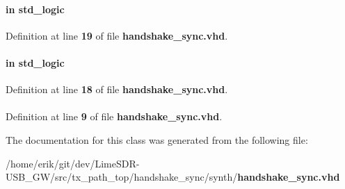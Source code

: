 \paragraph[{src\+\_\+in}]{ {\bfseries \textcolor{keywordflow}{in}\textcolor{vhdlchar}{ }} {\bfseries \textcolor{comment}{std\+\_\+logic}\textcolor{vhdlchar}{ }} \hspace{0.3cm}{\ttfamily [Port]}}\label{classhandshake__sync_a80752360df700ce3f58095a2b3c316e2}


Definition at line {\bf 19} of file {\bf handshake\+\_\+sync.\+vhd}.

\paragraph[{src\+\_\+reset\+\_\+n}]{ {\bfseries \textcolor{keywordflow}{in}\textcolor{vhdlchar}{ }} {\bfseries \textcolor{comment}{std\+\_\+logic}\textcolor{vhdlchar}{ }} \hspace{0.3cm}{\ttfamily [Port]}}\label{classhandshake__sync_a83b62edbc14070a445602ed957bec280}


Definition at line {\bf 18} of file {\bf handshake\+\_\+sync.\+vhd}.

\paragraph[{std\+\_\+logic\+\_\+1164}]{\hspace{0.3cm}{\ttfamily [Package]}}\label{classhandshake__sync_acd03516902501cd1c7296a98e22c6fcb}


Definition at line {\bf 9} of file {\bf handshake\+\_\+sync.\+vhd}.



The documentation for this class was generated from the following file\+:\begin{DoxyCompactItemize}
\item 
/home/erik/git/dev/\+Lime\+S\+D\+R-\/\+U\+S\+B\+\_\+\+G\+W/src/tx\+\_\+path\+\_\+top/handshake\+\_\+sync/synth/{\bf handshake\+\_\+sync.\+vhd}\end{DoxyCompactItemize}
